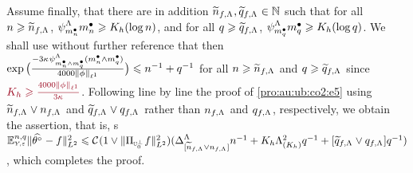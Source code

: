 \begin{pro}
Assume finally, that there are in addition
$\widetilde{\ssY}_{\xdf,\iSv},\widetilde{\ssE}_{\xdf,\iSv}\in\Nz$ such
that for all $\ssY\geq\widetilde{\ssY}_{\xdf,\iSv}$,
$\cmiSv[\sDi{\ssY}]\sDi{\ssY}\geq K_{\ydf}(\log\ssY)$, and for all
$\ssE\geq\widetilde{\ssE}_{\xdf,\iSv}$,
$\cmiSv[\sDi{\ssE}]\sDi{\ssE}\geq K_{\ydf}(\log\ssE)$.
We shall use without further
reference that then $\exp\big(\tfrac{-3\cpen\cmiSv[\sDi{\ssY}\wedge\sDi{\ssE}](\sDi{\ssY}\wedge\sDi{\ssE})}{4000\Vnormlp[1]{\fydf}}\big)\leq\ssY^{-1}+\ssE^{-1}$ for
all $\ssY\geq\widetilde{\ssY}_{\xdf,\iSv}$ and $\ssE\geq\widetilde{\ssE}_{\xdf,\iSv}$
since $\dr K_{\ydf}\geq
\tfrac{4000\Vnormlp[1]{\fydf}}{3\cpen}$. Following line by line the
proof of \eqref{pro:au:ub:co2:e5} using
$\widetilde{\ssY}_{\xdf,\iSv}\vee\ssY_{\xdf,\iSv}$ and
$\widetilde{\ssE}_{\xdf,\iSv}\vee\ssE_{\xdf,\iSv}$ rather than
$\ssY_{\xdf,\iSv}$ and $\ssE_{\xdf,\iSv}$, respectively, we obtain the
assertion, that is,
s $\FuEx[\ssY,\ssE]{\rY,\rE}\VnormLp{\hxdfPr[]-\xdf}^2
\leq\cst{}(1\vee\VnormLp{\Proj[{\mHiH[0]^\perp}]\xdf}^2)(\DipenSv[{[\widetilde{\ssY}_{\xdf,\iSv}\vee\ssY_{\xdf,\iSv}]}]\ssY^{-1}+K_{\ydf}\miSv[K_{\ydf}]^2\ssE^{-1}+[\widetilde{\ssE}_{\xdf,\iSv}\vee\ssE_{\xdf,\iSv}]\ssE^{-1})$, which completes the proof.
\end{pro}
